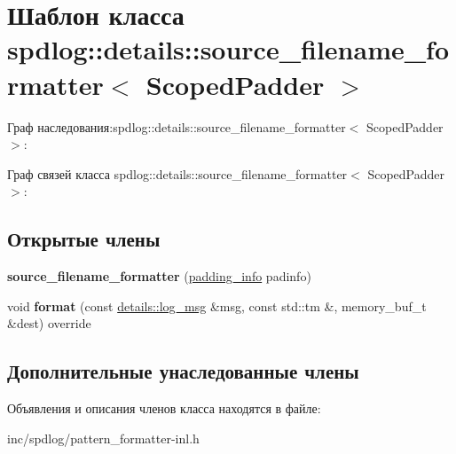 \hypertarget{classspdlog_1_1details_1_1source__filename__formatter}{}\section{Шаблон класса spdlog\+:\+:details\+:\+:source\+\_\+filename\+\_\+formatter$<$ Scoped\+Padder $>$}
\label{classspdlog_1_1details_1_1source__filename__formatter}


Граф наследования\+:spdlog\+:\+:details\+:\+:source\+\_\+filename\+\_\+formatter$<$ Scoped\+Padder $>$\+:


Граф связей класса spdlog\+:\+:details\+:\+:source\+\_\+filename\+\_\+formatter$<$ Scoped\+Padder $>$\+:
\subsection*{Открытые члены}
\begin{DoxyCompactItemize}
\item 
\mbox{\label{classspdlog_1_1details_1_1source__filename__formatter_a527e3f48d6e4b839892ae41f9be49d34}} 
{\bfseries source\+\_\+filename\+\_\+formatter} (\hyperlink{structspdlog_1_1details_1_1padding__info}{padding\+\_\+info} padinfo)
\item 
\mbox{\label{classspdlog_1_1details_1_1source__filename__formatter_a864ad464fec761b91b348aff789e4cd0}} 
void {\bfseries format} (const \hyperlink{structspdlog_1_1details_1_1log__msg}{details\+::log\+\_\+msg} \&msg, const std\+::tm \&, memory\+\_\+buf\+\_\+t \&dest) override
\end{DoxyCompactItemize}
\subsection*{Дополнительные унаследованные члены}


Объявления и описания членов класса находятся в файле\+:\begin{DoxyCompactItemize}
\item 
inc/spdlog/pattern\+\_\+formatter-\/inl.\+h\end{DoxyCompactItemize}
